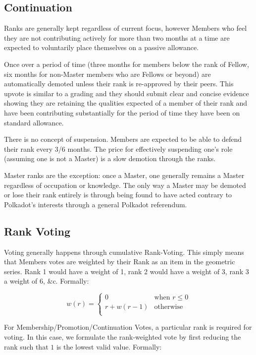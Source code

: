 \documentclass[9pt,oneside]{amsart}
\begin{document}
\subsection{Continuation}

Ranks are generally kept regardless of current focus, however Members who feel they are not contributing actively for more than two months at a time are expected to voluntarily place themselves on a passive allowance.

Once over a period of time (three months for members below the rank of Fellow, six months for non-Master members who are Fellows or beyond) are automatically demoted unless their rank is re-approved by their peers. This upvote is similar to a grading and they should submit clear and concise evidence showing they are retaining the qualities expected of a member of their rank and have been contributing substantially for the period of time they have been on standard allowance.

There is no concept of suspension. Members are expected to be able to defend their rank every 3/6 months. The price for effectively suspending one's role (assuming one is not a Master) is a slow demotion through the ranks.

Master ranks are the exception: once a Master, one generally remains a Master regardless of occupation or knowledge. The only way a Master may be demoted or lose their rank entirely is through being found to have acted contrary to Polkadot's interests through a general Polkadot referendum.

\subsection{Rank Voting}\label{rank-voting}

Voting generally happens through cumulative Rank-Voting. This simply means that Members votes are weighted by their Rank as an item in the geometric series. Rank 1 would have a weight of 1, rank 2 would have a weight of 3, rank 3 a weight of 6, \&c. Formally:

\begin{equation}
  w(r) = \begin{cases}
    0 & \text{when } r \leq 0 \\
    r + w(r - 1) & \text{otherwise} \\
  \end{cases} 
\end{equation}

For Membership/Promotion/Continuation Votes, a particular rank is required for voting. In this case, we formulate the rank-weighted vote by first reducing the rank such that $1$ is the lowest valid value. Formally:
\end{document}
